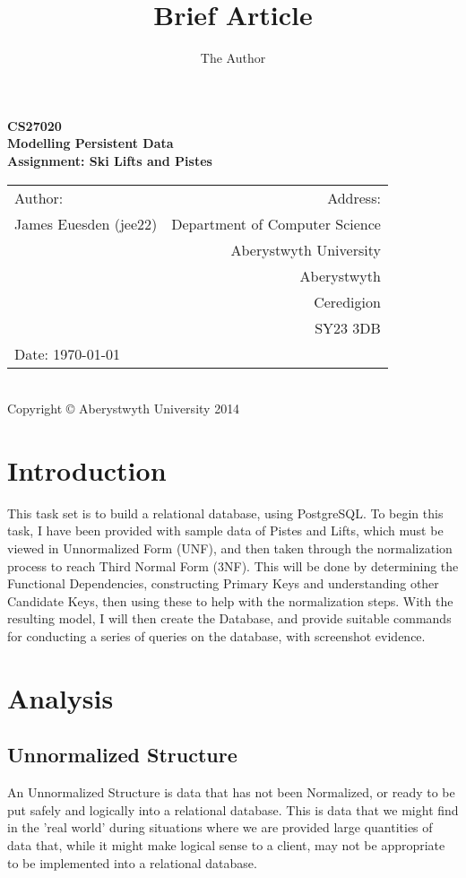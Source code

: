 \documentclass[11pt]{scrartcl} %
\title{Brief Article}
\author{The Author}
\begin{document}
\newpage

\begin{center}
\textbf{\LARGE CS27020}\\[0.3cm]
\textbf{\LARGE Modelling Persistent Data}\\[0.5cm]
\textbf{\LARGE Assignment: Ski Lifts and Pistes }\\[13cm]

\begin{tabular}{ l | r }
{\large Author:} & {\large Address:} \\
James Euesden (jee22) &  Department of Computer Science \\
 & Aberystwyth University \\ 
 & Aberystwyth \\
 & Ceredigion \\
 & SY23 3DB \\
{\large Date:} \today  &  \\

\end{tabular} \\[0.2cm]

{\small Copyright © Aberystwyth University 2014}

\end{center}



\newpage

\section{Introduction}
This task set is to build a relational database, using PostgreSQL. To begin this task, I have been provided with sample data of Pistes and Lifts, which must be viewed in Unnormalized Form (UNF), and then taken through the normalization process to reach Third Normal Form (3NF). This will be done by determining the Functional Dependencies, constructing Primary Keys and understanding other Candidate Keys, then using these to help with the normalization steps. With the resulting model, I will then create the Database, and provide suitable commands for conducting a series of queries on the database, with screenshot evidence.
\section{Analysis}
\subsection{Unnormalized Structure}
An Unnormalized Structure is data that has not been Normalized, or ready to be put safely and logically into a relational database. This is data that we might find in the 'real world' during situations where we are provided large quantities of data that, while it might make logical sense to a client, may not be appropriate to be implemented into a relational database.
\end{document}
